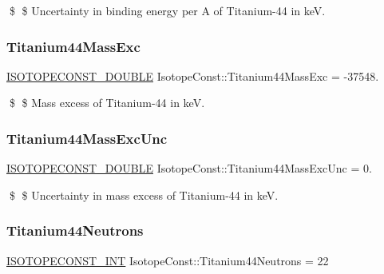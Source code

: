 \$ \$ Uncertainty in binding energy per A of Titanium-\/44 in keV. \mbox{\label{group___isotope_const-_titanium-_ti44_ga3266a35bb833f2b8ea515fcf7855705e}} 
\subsubsection{\texorpdfstring{Titanium44\+Mass\+Exc}{Titanium44MassExc}}
{\footnotesize\ttfamily \mbox{\hyperlink{group___isotope_const-_macros_ga8f45a7272ce02c0b4c65c44636ed719a}{I\+S\+O\+T\+O\+P\+E\+C\+O\+N\+S\+T\+\_\+\+D\+O\+U\+B\+LE}} Isotope\+Const\+::\+Titanium44\+Mass\+Exc = -\/37548.}

\$ \$ Mass excess of Titanium-\/44 in keV. \mbox{\label{group___isotope_const-_titanium-_ti44_ga04d46384fea2ab73813171f3a3cadd47}} 
\subsubsection{\texorpdfstring{Titanium44\+Mass\+Exc\+Unc}{Titanium44MassExcUnc}}
{\footnotesize\ttfamily \mbox{\hyperlink{group___isotope_const-_macros_ga8f45a7272ce02c0b4c65c44636ed719a}{I\+S\+O\+T\+O\+P\+E\+C\+O\+N\+S\+T\+\_\+\+D\+O\+U\+B\+LE}} Isotope\+Const\+::\+Titanium44\+Mass\+Exc\+Unc = 0.}

\$ \$ Uncertainty in mass excess of Titanium-\/44 in keV. \mbox{\label{group___isotope_const-_titanium-_ti44_ga0d41964881aab19c65ecc51eaa06dc9f}} 
\subsubsection{\texorpdfstring{Titanium44\+Neutrons}{Titanium44Neutrons}}
{\footnotesize\ttfamily \mbox{\hyperlink{group___isotope_const-_macros_ga5f18360b3e99483a35c32d789e62621c}{I\+S\+O\+T\+O\+P\+E\+C\+O\+N\+S\+T\+\_\+\+I\+NT}} Isotope\+Const\+::\+Titanium44\+Neutrons = 22}


